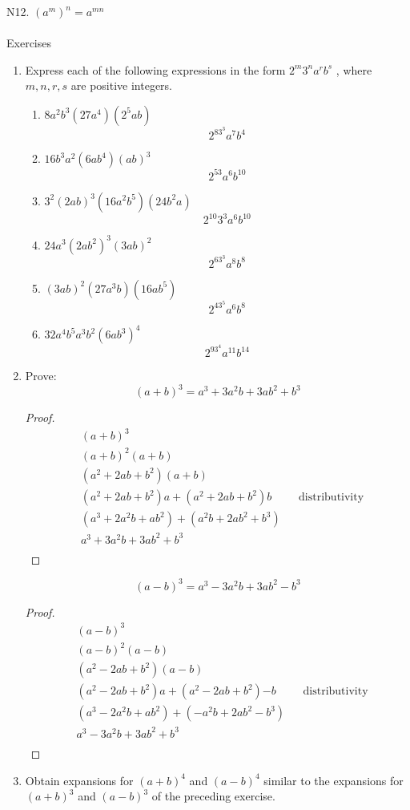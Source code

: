 \documentclass{article}
\begin{document}
N12. $(a^m)^n = a^{mn}$\\
\leavevmode \\
Exercises
\begin{enumerate}
 \item Express each of the following expressions in the form $2^m3^na^rb^s$ , where $m,
n, r, s$ are positive integers.
 \begin{enumerate}
  \item $8a^2b^3(27a^4)(2^5ab)$ \[2^83^3a^7b^4\]
  \item $16b^3a^2(6ab^4)(ab)^3$ \[2^53a^6b^{10}\]
  \item $3^2(2ab)^3(16a^2b^5)(24b^2a)$ \[2^{10}3^3a^6b^{10}\]
\item $24a^3(2ab^2)^3(3ab)^2$ \[2^63^3a^8b^8\]
\item $(3ab)^2(27a^3b)(16ab^5)$ \[2^43^5a^6b^8\]
\item $32a^4b^5a^3b^2(6ab^3)^4$ \[2^93^4a^{11}b^{14}\]
 \end{enumerate}
\item Prove: \[(a + b)^3 = a^3 + 3a^2b + 3ab^2 + b^3\]
\begin{proof}
 \begin{align*}
	&(a + b)^3\\
	&(a+b)^2(a+b)\\
	&(a^2+2ab+b^2)(a+b)\\
	&(a^2+2ab+b^2)a + (a^2+2ab+b^2)b &&\text{distributivity}\\
	&(a^3+2a^2b+ab^2) + (a^2b+2ab^2+b^3)\\
	&a^3 + 3a^2b + 3ab^2 + b^3\\
 \end{align*}
\end{proof}
\[(a - b)^3 = a^3 - 3a^2b + 3ab^2 - b^3\]
\begin{proof}
 \begin{align*}
	&(a - b)^3\\
	&(a-b)^2(a-b)\\
	&(a^2-2ab+b^2)(a-b)\\
	&(a^2-2ab+b^2)a + (a^2-2ab+b^2){-b} &&\text{distributivity}\\
	&(a^3-2a^2b+ab^2) + (-a^2b+2ab^2-b^3)\\
	&a^3 - 3a^2b + 3ab^2 + b^3\\
 \end{align*}
\end{proof}
\item Obtain expansions for $(a + b)^4$ and $(a - b)^4$ similar to the expansions for $(a + b)^3$ and $(a - b)^3$ of the preceding exercise.

\end{enumerate}
\end{document}
